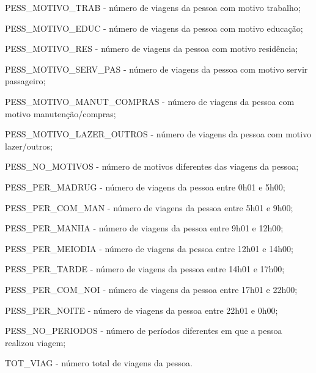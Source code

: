 \begin{compactitem}
\begin{compactitem}[]
\item PESS_MOTIVO_TRAB - número de viagens da pessoa com motivo trabalho;
\item PESS_MOTIVO_EDUC - número de viagens da pessoa com motivo educação;
\item PESS_MOTIVO_RES - número de viagens da pessoa com motivo residência;
\item PESS_MOTIVO_SERV_PAS - número de viagens da pessoa com motivo servir passageiro;
\item PESS_MOTIVO_MANUT_COMPRAS - número de viagens da pessoa com motivo manutenção/compras;
\item PESS_MOTIVO_LAZER_OUTROS - número de viagens da pessoa com motivo lazer/outros;
\item PESS_NO_MOTIVOS - número de motivos diferentes das viagens da pessoa;
\item PESS_PER_MADRUG - número de viagens da pessoa entre 0h01 e 5h00;
\item PESS_PER_COM_MAN - número de viagens da pessoa entre 5h01 e 9h00;
\item PESS_PER_MANHA - número de viagens da pessoa entre 9h01 e 12h00;
\item PESS_PER_MEIODIA - número de viagens da pessoa entre 12h01 e 14h00;
\item PESS_PER_TARDE - número de viagens da pessoa entre 14h01 e 17h00;
\item PESS_PER_COM_NOI - número de viagens da pessoa entre 17h01 e 22h00;
\item PESS_PER_NOITE - número de viagens da pessoa entre 22h01 e 0h00;
\item PESS_NO_PERIODOS - número de períodos diferentes em que a pessoa realizou viagem;
\item TOT_VIAG  - número total de viagens da pessoa.
\end{compactitem}
\end{compactitem}


